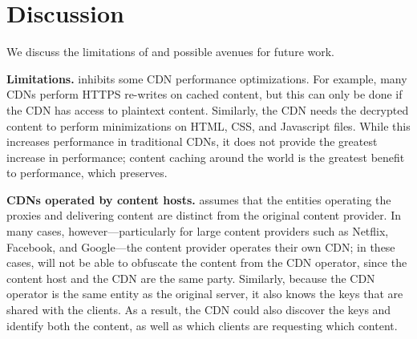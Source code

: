 \section{Discussion}
\label{sec:discussion}

We discuss the limitations
of \system{} and possible avenues for future work. 

\textbf{Limitations.} \system{} inhibits some CDN performance optimizations.  For
example,
many CDNs perform HTTPS re-writes on cached content, but this can only be 
done if the CDN has access to plaintext content.  Similarly, the CDN needs the 
decrypted content to perform minimizations on HTML, CSS, and Javascript files.  While 
this increases performance in traditional CDNs, it does not provide the greatest 
increase in performance; content caching around the world is the greatest benefit to 
performance, which \system{} preserves.

\textbf{CDNs operated by content hosts.} \system{}
assumes that the entities operating the proxies and delivering content are
distinct from the original content provider. In many cases, however---particularly
for large content providers such as Netflix, Facebook, and Google---the
content provider operates their own CDN; in these cases, \system{} will
not be able to obfuscate the content from the CDN operator, since the content host
and the CDN are the same party.  Similarly, because the CDN operator is the same
entity as the original server, it also knows the keys that are shared with the clients.
As a result, the CDN could also discover the keys and identify both
the content, as well as which clients are requesting which content.

